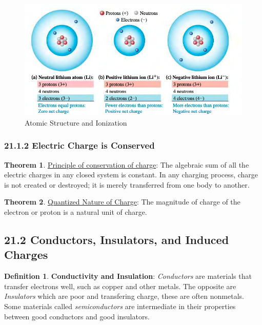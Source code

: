 \documentclass[12pt]{amsart}
\theoremstyle{definition}
\newtheorem{theorem}{Theorem}  %
\newtheorem{definition}{Definition} %
\numberwithin{equation}{theorem}    %
\begin{document}
\begin{figure}[H]
    \centering
    \includegraphics[width=5in]{Media/Atomic.png}
    \caption{Atomic Structure and Ionization}
    \label{Atomic Structure and Ionization}
\end{figure}

\subsubsection*{21.1.2 Electric Charge is Conserved}

\begin{theorem}
    \underline{Principle of conservation of charge}:
    The algebraic sum of all the electric charges in any closed system is 
    constant. In any charging process, charge is not created or destroyed; 
    it is merely transferred from one body to another.
\end{theorem}

\begin{theorem}
    \underline{Quantized Nature of Charge}:
    The magnitude of charge of the electron or proton is a natural unit of charge.
\end{theorem}

\subsection*{21.2 Conductors, Insulators, and Induced Charges}
\begin{definition}
    \textbf{Conductivity and Insulation}: 
    \textit{Conductors} are materials that transfer electrons well, such as 
    copper and other metals. The opposite are \textit{Insulators} which are 
    poor and transfering charge, these are often nonmetals. Some materials 
    called \textit{semiconductors} are intermediate in their properties between
    good conductors and good insulators.
\end{definition}
\end{document}
